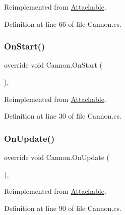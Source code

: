 Reimplemented from \mbox{\hyperlink{class_attachable_a068e297fb6be04b5162db5ce61290020}{Attachable}}.



Definition at line 66 of file Cannon.\+cs.

\mbox{\label{class_cannon_ab530656c8ae8981ced0162cfdd8f9cb2}} 
\subsubsection{\texorpdfstring{On\+Start()}{OnStart()}}
{\footnotesize\ttfamily override void Cannon.\+On\+Start (\begin{DoxyParamCaption}{ }\end{DoxyParamCaption})\hspace{0.3cm}{\ttfamily [protected]}, {\ttfamily [virtual]}}



Reimplemented from \mbox{\hyperlink{class_attachable_a3c05c0b07b831881a7ab245057d34d30}{Attachable}}.



Definition at line 30 of file Cannon.\+cs.

\mbox{\label{class_cannon_aa5d69c897923c5ac5bdcc16b18f1cf85}} 
\subsubsection{\texorpdfstring{On\+Update()}{OnUpdate()}}
{\footnotesize\ttfamily override void Cannon.\+On\+Update (\begin{DoxyParamCaption}{ }\end{DoxyParamCaption})\hspace{0.3cm}{\ttfamily [protected]}, {\ttfamily [virtual]}}



Reimplemented from \mbox{\hyperlink{class_attachable_abb659a66efacd6fa09fa1d7125c7b5e6}{Attachable}}.



Definition at line 90 of file Cannon.\+cs.

\mbox{\label{class_cannon_a960d1029f84d68f9a7e6404bed82b1c5}} 
